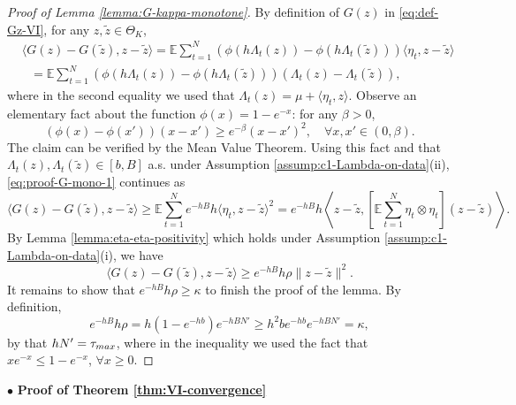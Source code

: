 \documentclass[11pt]{article}
\theoremstyle{remark}
\theoremstyle{plain}
\newcommand{\E}{\mathbb{E}}
\begin{document}
%
\begin{proof}[Proof of Lemma \ref{lemma:G-kappa-monotone}]
By definition of $G(z)$ in \eqref{eq:def-Gz-VI}, for any $z, \tilde z \in \Theta_K$,
\begin{align} 
&  \langle G( z) - G(\tilde z), z - \tilde z \rangle
 = \E \sum_{t=1}^N \left( \phi( h \Lambda_t( z)) - \phi( h \Lambda_t(\tilde z)) \right) \langle \eta_t , z - \tilde z \rangle 
	 \nonumber \\
&~~~
=  \E \sum_{t=1}^N \left( \phi( h \Lambda_t( z)) - \phi( h \Lambda_t(\tilde z)) \right)  (\Lambda_t(z) - \Lambda_t(\tilde z)),
\label{eq:proof-G-mono-1} 
\end{align}
where in the second equality we used that $\Lambda_t ( z ) = \mu + \langle \eta_t , z \rangle$.
Observe an elementary fact about the function $\phi(x) = 1-e^{-x}$: for any $\beta >0 $,
\begin{equation}
(\phi(x) - \phi(x'))(x-x') \ge e^{-\beta} (x-x')^2, \quad \forall x, x' \in (0, \beta).
\end{equation}
The claim can be verified by the Mean Value Theorem.
Using this fact and that $\Lambda_t(z), \Lambda_t(\tilde z)  \in [b,B]$ a.s. under Assumption \ref{assump:c1-Lambda-on-data}(ii), \eqref{eq:proof-G-mono-1} continues as
\[
 \langle G(z) - G(\tilde z), z - \tilde z \rangle
 \ge \E \sum_{t=1}^N e^{-hB} h \langle  \eta_t , z - \tilde z \rangle^2
 = e^{-hB} h \left\langle  z - \tilde z,  \left[ \E \sum_{t=1}^N   \eta_t  \otimes \eta_t \right] (z - \tilde z) \right\rangle.
 \]
By Lemma \ref{lemma:eta-eta-positivity} which holds under Assumption \ref{assump:c1-Lambda-on-data}(i), we have
\[
 \langle G(z) - G(\tilde z), z - \tilde z \rangle
 \ge e^{-hB} h \rho \| z - \tilde z \|^2.
\]
It remains to show that $ e^{-hB} h \rho  \ge \kappa$ to finish the proof of the lemma.  By definition, 
\[
e^{-hB} h \rho 
=  h  (1-e^{-hb}) e^{-hB N'}
\ge h^2 b e^{-hb} e^{-hB N'} = \kappa,
\]
by that $hN' = \tau_{\rm max}$, 
where in the inequality we used the fact that $ x e^{-x} \le 1-e^{-x}$, $\forall x \ge 0$.
\end{proof}


\vspace{5pt}
\noindent
$\bullet$ \textbf{ Proof of Theorem \ref{thm:VI-convergence} }
\vspace{5pt}
\end{document}
